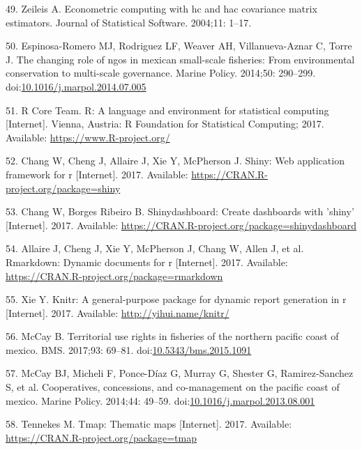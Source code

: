 \documentclass[12pt,]{article}
\begin{document}
\hypertarget{ref-sandwich_2014}{}
49. Zeileis A. Econometric computing with hc and hac covariance matrix
estimators. Journal of Statistical Software. 2004;11: 1--17.

\hypertarget{ref-espinosaromero_2014-PY}{}
50. Espinosa-Romero MJ, Rodriguez LF, Weaver AH, Villanueva-Aznar C,
Torre J. The changing role of ngos in mexican small-scale fisheries:
From environmental conservation to multi-scale governance. Marine
Policy. 2014;50: 290--299.
doi:\href{https://doi.org/10.1016/j.marpol.2014.07.005}{10.1016/j.marpol.2014.07.005}

\hypertarget{ref-rcore_2017}{}
51. R Core Team. R: A language and environment for statistical computing
{[}Internet{]}. Vienna, Austria: R Foundation for Statistical Computing;
2017. Available: \url{https://www.R-project.org/}

\hypertarget{ref-shiny_2017}{}
52. Chang W, Cheng J, Allaire J, Xie Y, McPherson J. Shiny: Web
application framework for r {[}Internet{]}. 2017. Available:
\url{https://CRAN.R-project.org/package=shiny}

\hypertarget{ref-shinydashboard_2017}{}
53. Chang W, Borges Ribeiro B. Shinydashboard: Create dashboards with
'shiny' {[}Internet{]}. 2017. Available:
\url{https://CRAN.R-project.org/package=shinydashboard}

\hypertarget{ref-rmarkdown_2017}{}
54. Allaire J, Cheng J, Xie Y, McPherson J, Chang W, Allen J, et al.
Rmarkdown: Dynamic documents for r {[}Internet{]}. 2017. Available:
\url{https://CRAN.R-project.org/package=rmarkdown}

\hypertarget{ref-knitr_2017}{}
55. Xie Y. Knitr: A general-purpose package for dynamic report
generation in r {[}Internet{]}. 2017. Available:
\url{http://yihui.name/knitr/}

\hypertarget{ref-mccay_2017-1m}{}
56. McCay B. Territorial use rights in fisheries of the northern pacific
coast of mexico. BMS. 2017;93: 69--81.
doi:\href{https://doi.org/10.5343/bms.2015.1091}{10.5343/bms.2015.1091}

\hypertarget{ref-mccay_2014-CN}{}
57. McCay BJ, Micheli F, Ponce-Díaz G, Murray G, Shester G,
Ramirez-Sanchez S, et al. Cooperatives, concessions, and co-management
on the pacific coast of mexico. Marine Policy. 2014;44: 49--59.
doi:\href{https://doi.org/10.1016/j.marpol.2013.08.001}{10.1016/j.marpol.2013.08.001}

\hypertarget{ref-tmap_2017}{}
58. Tennekes M. Tmap: Thematic maps {[}Internet{]}. 2017. Available:
\url{https://CRAN.R-project.org/package=tmap}
\end{document}

